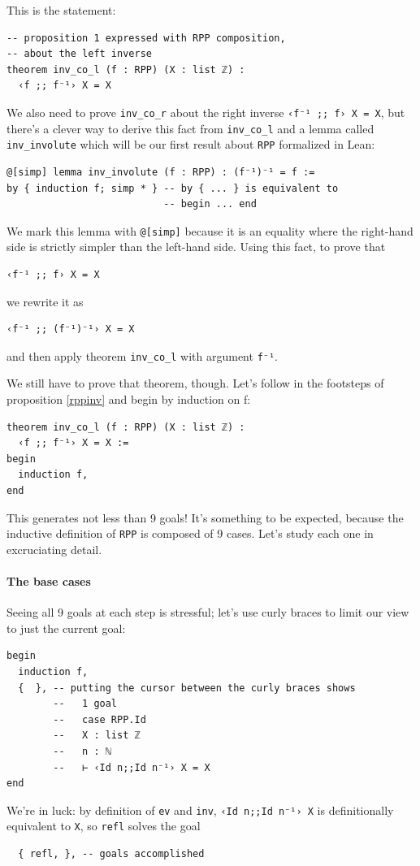 \documentclass{book}
\theoremstyle{definition}
\theoremstyle{remark}
\theoremstyle{plain}
\begin{document}
This is the statement:
\begin{lstlisting}
-- proposition 1 expressed with RPP composition,
-- about the left inverse
theorem inv_co_l (f : RPP) (X : list ℤ) :
  ‹f ;; f⁻¹› X = X
\end{lstlisting}
We also need to prove \lstinline{inv_co_r} about the right inverse \lstinline{‹f⁻¹ ;; f› X = X},
but there's a clever way to derive this fact from \lstinline{inv_co_l}
and a lemma called \lstinline{inv_involute} which will be our first result about \lstinline{RPP} formalized in Lean:
\begin{lstlisting}
@[simp] lemma inv_involute (f : RPP) : (f⁻¹)⁻¹ = f :=
by { induction f; simp * } -- by { ... } is equivalent to
                           -- begin ... end
\end{lstlisting}
We mark this lemma with \lstinline{@[simp]} because it is an equality where the right-hand side is strictly simpler than the left-hand side.
Using this fact, to prove that
\begin{lstlisting}
‹f⁻¹ ;; f› X = X
\end{lstlisting}
we rewrite it as
\begin{lstlisting}
‹f⁻¹ ;; (f⁻¹)⁻¹› X = X
\end{lstlisting}
and then apply theorem \lstinline{inv_co_l} with argument \lstinline{f⁻¹}.

We still have to prove that theorem, though.
Let's follow in the footsteps of proposition \ref{rppinv} and begin by induction on f:
\begin{lstlisting}
theorem inv_co_l (f : RPP) (X : list ℤ) :
  ‹f ;; f⁻¹› X = X :=
begin
  induction f,
end
\end{lstlisting}
This generates not less than 9 goals!
It's something to be expected, because the inductive definition of \lstinline{RPP} is composed of 9 cases.
Let's study each one in excruciating detail.

\paragraph{The base cases}

Seeing all 9 goals at each step is stressful;
let's use curly braces to limit our view to just the current goal:
\begin{lstlisting}
begin
  induction f,
  {  }, -- putting the cursor between the curly braces shows
        --   1 goal
        --   case RPP.Id
        --   X : list ℤ
        --   n : ℕ
        --   ⊢ ‹Id n;;Id n⁻¹› X = X
end
\end{lstlisting}
We're in luck: by definition of \lstinline{ev} and \lstinline{inv},
\lstinline{‹Id n;;Id n⁻¹› X} is definitionally equivalent to \lstinline{X},
so \lstinline{refl} solves the goal
\begin{lstlisting}
  { refl, }, -- goals accomplished
\end{lstlisting}
\end{document}
